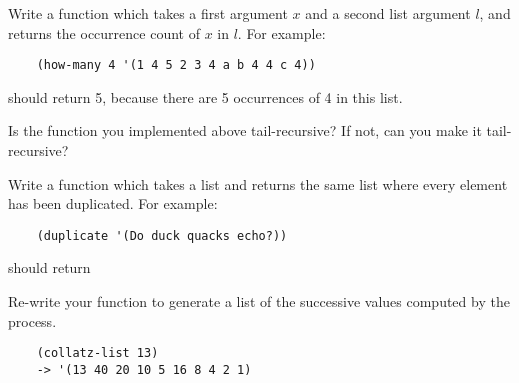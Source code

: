 \documentclass{../../../tp}
\begin{document}
\begin{instruction}	
	Write a function  which takes a first argument $x$ and a second list argument $l$, and returns the occurrence count of $x$ in $l$. For example:
	
	\begin{verbatim}
	(how-many 4 '(1 4 5 2 3 4 a b 4 4 c 4))
	\end{verbatim}
	
	should return 5, because there are 5 occurrences of 4 in this list.
\end{instruction}

\begin{instruction}	
	Is the  function you implemented above tail-recursive? If not, can you make it tail-recursive?
\end{instruction}

\begin{instruction}	
	Write a function  which takes a list and returns the same list where every element has been duplicated. For example:
	
	\begin{verbatim}
	(duplicate '(Do duck quacks echo?))
	\end{verbatim}
	
	should return 
\end{instruction}


\begin{instruction}	
	Re-write your  function to generate a list of the successive values computed by the process. 
	
	\begin{verbatim}
	(collatz-list 13)
	-> '(13 40 20 10 5 16 8 4 2 1)
	\end{verbatim}
\end{instruction}
\end{document}
